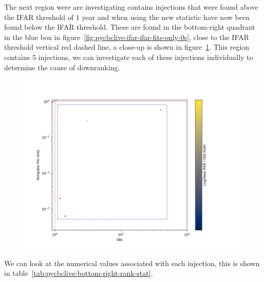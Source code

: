 The next region were are investigating contains injections that were found above the IFAR threshold of $1$ year and when using the new statistic have now been found below the IFAR threshold. These are found in the bottom-right quadrant in the blue box in figure~\ref{fig:pycbclive-ifar-ifar-fits-only-0s}, close to the IFAR threshold vertical red dashed line, a close-up is shown in figure~\ref{fig:pycbclive-bottom-right-region}. This region contains 5 injections, we can investigate each of these injections individually to determine the cause of downranking.
%
\begin{figure}
       \centering
    \includegraphics[width=1\textwidth]{images/pycbclive/prev_found_ifar_vs_ifar_region.png}
    \caption{}
    \label{fig:pycbclive-bottom-right-region}
\end{figure}
%
We can look at the numerical values associated with each injection, this is shown in table~\ref{tab:pycbclive-bottom-right-rank-stat}.
%
